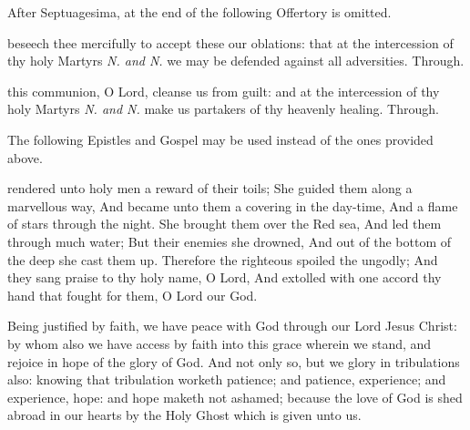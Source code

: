 \begin{rubric}
	After Septuagesima,  at the end of the following Offertory is omitted.
\end{rubric}


\secret\label{CommonMartyrsIIISecret}
 beseech thee mercifully to accept these our oblations: that at the intercession of thy holy Martyrs \textit{N. and N.} we may be defended against all adversities. Through.


\postcommunion\label{CommonMartyrsIIIPostcommunion}
 this communion, O Lord, cleanse us from guilt: and at the intercession of thy holy Martyrs \textit{N. and N.} make us partakers of thy heavenly healing. Through.

\begin{rubric}
	The following Epistles and Gospel may be used instead of the ones provided above.
\end{rubric}

\label{Wisdom1017}
 rendered unto holy men a reward of their toils; She guided them along a marvellous way, And became unto them a covering in the day-time, And a flame of stars through the night. She brought them over the Red sea, And led them through much water; But their enemies she drowned, And out of the bottom of the deep she cast them up. Therefore the righteous spoiled the ungodly; And they sang praise to thy holy name, O Lord, And extolled with one accord thy hand that fought for them, O Lord our God.


\label{Romans51}
 Being justified by faith, we have peace with God through our Lord Jesus Christ: by whom also we have access by faith into this grace wherein we stand, and rejoice in hope of the glory of God. And not only so, but we glory in tribulations also: knowing that tribulation worketh patience; and patience, experience; and experience, hope: and hope maketh not ashamed; because the love of God is shed abroad in our hearts by the Holy Ghost which is given unto us.

